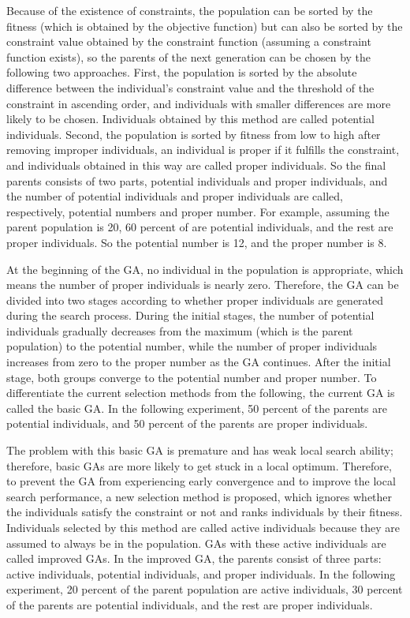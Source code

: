 \documentclass[Afour,sagev,times]{sagej}
\begin{document}
Because of the existence of constraints, the population can be sorted by the
fitness (which is obtained by the objective function) but can also be sorted by the constraint value
obtained by the constraint function (assuming a constraint function exists), so the parents of the next
generation can be chosen by the following two approaches. First, the population is sorted by the
absolute difference between the individual's constraint value and the threshold of the constraint in
ascending order, and individuals with smaller differences are more likely to be chosen. Individuals
obtained by this method are called potential individuals. Second, the population is sorted by fitness
from low to high after removing improper individuals, an individual is proper if it
fulfills the constraint, and individuals obtained in this way are called proper individuals. So the
final parents consists of two parts, potential individuals and proper individuals, and the number of
potential individuals and proper individuals are called, respectively, potential numbers and proper
number. For example, assuming the parent population is 20, 60 percent of are potential
individuals, and the rest are proper individuals. So the potential number is 12, and the proper
number is 8.

At the beginning of the GA, no individual in the population is appropriate, which means the number
of proper individuals is nearly zero. Therefore, the GA can be divided into two stages according to whether
proper individuals are generated during the search process. During the initial stages, the number of
potential individuals gradually decreases from the maximum (which is the parent population) to the potential
number, while the number of proper individuals increases from zero to the proper number as the GA
continues. After the initial stage, both groups converge to the
potential number and proper number. To differentiate the current selection methods from
the following, the current GA is called the basic GA. In the following experiment, 50 percent of the
parents are potential individuals, and 50 percent of the parents are proper individuals.

The problem with this basic GA is premature and has weak local search ability; therefore, basic GAs are more likely
to get stuck in a local optimum. Therefore, to prevent the GA from experiencing early convergence and to improve the
local search performance, a new selection method is proposed, which ignores whether the
individuals satisfy the constraint or not and ranks individuals by their fitness. Individuals
selected by this method are called active individuals because they are assumed to always be in the
population. GAs with these active individuals are called improved GAs. In the improved GA, the parents
consist of three parts: active individuals, potential individuals, and proper individuals. In the
following experiment, 20 percent of the parent population are active individuals, 30 percent of the
parents are potential individuals, and the rest are proper individuals.
\end{document}
